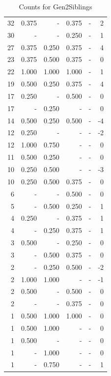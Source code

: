 \documentclass[a4paper]{article}\usepackage[]{graphicx}\usepackage[]{color}
\begin{document}
\begin{table}[ht]
\begin{tabular}{rrrrrr}
   \rowcolor{sosoColor} 32 & 0.375 & - & 0.375 & - & 2 \\ 
   \rowcolor{sosoColor} 30 & - & - & 0.250 & - & 1 \\ 
  27 & 0.375 & 0.250 & 0.375 & - & 4 \\ 
  23 & 0.375 & 0.500 & 0.375 & - & 0 \\ 
   \rowcolor{goodColor} 22 & 1.000 & 1.000 & 1.000 & - & 1 \\ 
  19 & 0.500 & 0.250 & 0.375 & - & 4 \\ 
   \rowcolor{sosoColor} 17 & 0.250 & - & 0.500 & - & 0 \\ 
  17 & - & 0.250 & - & - & 0 \\ 
   \rowcolor{badColor} 14 & 0.500 & 0.250 & 0.500 & - & -4 \\ 
   \rowcolor{nullColor} 12 & 0.250 & - & - & - & -2 \\ 
  12 & 1.000 & 0.750 & - & - & 0 \\ 
  11 & 0.500 & 0.250 & - & - & 0 \\ 
  10 & 0.250 & 0.500 & - & - & -3 \\ 
  10 & 0.250 & 0.500 & 0.375 & - & 0 \\ 
   \rowcolor{sosoColor} 6 & - & - & 0.500 & - & 0 \\ 
   \rowcolor{badColor} 5 & - & 0.500 & 0.250 & - & 1 \\ 
   \rowcolor{sosoColor} 4 & 0.250 & - & 0.375 & - & 1 \\ 
  4 & - & 0.250 & 0.375 & - & 1 \\ 
   \rowcolor{sosoColor} 3 & 0.500 & - & 0.250 & - & 0 \\ 
  3 & - & 0.500 & 0.375 & - & 0 \\ 
   \rowcolor{badColor} 2 & - & 0.250 & 0.500 & - & -2 \\ 
  2 & 1.000 & 1.000 & - & - & -1 \\ 
   \rowcolor{sosoColor} 2 & 0.500 & - & 0.500 & - & 0 \\ 
   \rowcolor{sosoColor} 2 & - & - & 0.375 & - & 0 \\ 
   \rowcolor{goodColor} 1 & 0.500 & 1.000 & 1.000 & - & 0 \\ 
  1 & 0.500 & 1.000 & - & - & 0 \\ 
   \rowcolor{nullColor} 1 & 0.500 & - & - & - & 0 \\ 
  1 & - & 1.000 & - & - & 0 \\ 
  1 & - & 0.750 & - & - & 1 \\ 
   \hline
\end{tabular}
\caption{Counts for Gen2Siblings} 
\end{table}
\end{document}
